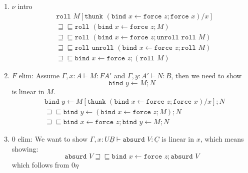 \documentclass[acmsmall,nonacm]{acmart}
\renewcommand{\u}{\underline}
\newcommand{\pipe}{\,\,|\,\,}
\newcommand{\ltdyn}{\sqsubseteq}
\newcommand{\gtdyn}{\sqsupseteq}
\newcommand{\equidyn}{\mathrel{\gtdyn\ltdyn}}
\newcommand{\pair}[2]{\{ \pi \mapsto {#1} \pipe \pi' \mapsto {#2}\}}
\newcommand{\pairone}[1]{\{ \pi \mapsto {#1}}
\newcommand{\pairtwo}[1]{\pipe \pi' \mapsto {#1}\}}
\newcommand{\roll}{\kw{roll}}
\newcommand{\unroll}{\kw{unroll}}
\newcommand{\bindXtoYinZ}[2]{\kw{bind}#2 \leftarrow #1;}
\newcommand{\kw}[1]{\texttt{#1}\,\,}
\newcommand{\absurd}{\kw{absurd}}
\newcommand{\thunk}{\kw{thunk}}
\newcommand{\force}{\kw{force}}
\newcommand{\with}{\mathbin{\&}}
\begin{document}
{\begin{longonly}
\begin{longproof}
\begin{enumerate}
\begin{align*}
      &\pairtwo{N[\thunk {(\bindXtoYinZ {\force z} x \force x)}/x]}\\
      &\equidyn \pairone{\bindXtoYinZ {\force z} x M}\tag{$M, N$ linear}\\
      &\qquad    \pairtwo{\bindXtoYinZ {\force z} x N}\\
      &\equidyn \pairone{\bindXtoYinZ {\force z} x {\pi \pair M N}}\tag{$\with\beta$}\\
      &\qquad    \pairtwo{\bindXtoYinZ {\force z} x {\pi' \pair M N}}\\
      &\equidyn \pairone{\pi({\bindXtoYinZ {\force z} x \pair M N})}\tag{$\u F\eta$}\\
      &\qquad    \pairtwo{\pi'({\bindXtoYinZ {\force z} x \pair M N})}\\
      &\equidyn \bindXtoYinZ {\force z} x \pair M N\tag{$\with\eta$}
    \end{align*}
  \item $\nu$ intro
    \begin{align*}
      & \roll M[\thunk{(\bindXtoYinZ {\force z} x \force x)}/x]\\
      &\equidyn \roll (\bindXtoYinZ {\force z} x M) \tag{$M$ is linear} \\
      &\equidyn \roll (\bindXtoYinZ {\force z} x \unroll \roll M) \tag{$\nu\beta$}\\
      &\equidyn \roll \unroll (\bindXtoYinZ {\force z} x \roll M) \tag{$\u F\eta$}\\
      &\equidyn \bindXtoYinZ {\force z} x (\roll M) \tag{$\nu\eta$}
    \end{align*}
  \item $\u F$ elim: Assume $\Gamma, x : A \vdash M : \u F A'$ and
    $\Gamma, y : A' \vdash N : \u B$, then we need to show
    \[ \bindXtoYinZ M y N \]
    is linear in $M$.
    \begin{align*}
      & \bindXtoYinZ {M[\thunk{(\bindXtoYinZ {\force z} x \force x)}/x]} y N\\
      & \equidyn
      \bindXtoYinZ {(\bindXtoYinZ {\force z} x M)} y N\tag{$M$ is linear}\\
      &\equidyn
      \bindXtoYinZ {\force z} x \bindXtoYinZ M y N\tag{$\u F\eta$}
    \end{align*}
  \item $0$ elim: We want to show $\Gamma, x:U\u B \vdash \absurd V :
    \u C$ is linear in $x$, which means showing:
    \[ \absurd V \equidyn \bindXtoYinZ {\force z} x \absurd V
    \]
    which follows from $0\eta$

\end{enumerate}
\end{longproof}
\end{longonly}}
\end{document}
